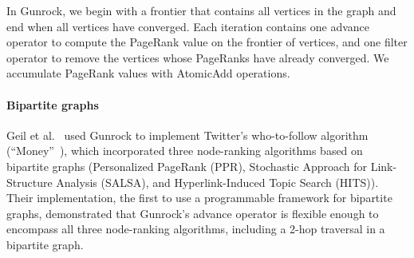 \documentclass[format=acmsmall,review=false,screen=true]{acmart}
\begin{document}
In Gunrock, we begin with a frontier that contains all vertices in the
graph and end when all vertices have converged. Each iteration
contains one advance operator to compute the PageRank value on the
frontier of vertices, and one filter operator to remove the vertices
whose PageRanks have already converged. We accumulate PageRank values
with AtomicAdd operations.

\paragraph{Bipartite graphs} Geil et al.~
used Gunrock to implement Twitter's who-to-follow algorithm
(``Money''~\cite{Goel:2015:WST}), which incorporated three
node-ranking algorithms based on bipartite graphs (Personalized
PageRank (PPR), Stochastic Approach for Link-Structure Analysis
(SALSA), and Hyperlink-Induced Topic Search (HITS))\@. Their
implementation, the first to use a programmable framework for
bipartite graphs, demonstrated that Gunrock's advance operator is
flexible enough to encompass all three node-ranking algorithms,
including a 2-hop traversal in a bipartite graph.
\end{document}
